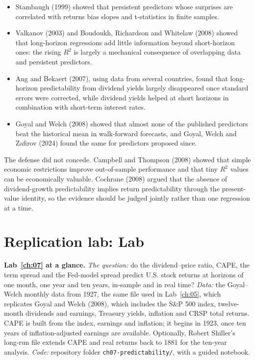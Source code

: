 \begin{itemize}
  \item Stambaugh (1999) showed that persistent predictors whose surprises are correlated with returns bias slopes and t-statistics in finite samples.
  \item Valkanov (2003) and Boudoukh, Richardson and Whitelaw (2008) showed that long-horizon regressions add little information beyond short-horizon ones: the rising $R^2$ is largely a mechanical consequence of overlapping data and persistent predictors.
  \item Ang and Bekaert (2007), using data from several countries, found that long-horizon predictability from dividend yields largely disappeared once standard errors were corrected, while dividend yields helped at short horizons in combination with short-term interest rates.
  \item Goyal and Welch (2008) showed that almost none of the published predictors beat the historical mean in walk-forward forecasts, and Goyal, Welch and Zafirov (2024) found the same for predictors proposed since.
\end{itemize}

The defense did not concede. Campbell and Thompson (2008) showed that simple economic restrictions improve out-of-sample performance and that tiny $R^2$ values can be economically valuable. Cochrane (2008) argued that the absence of dividend-growth predictability implies return predictability through the present-value identity, so the evidence should be judged jointly rather than one regression at a time.

\section{Replication lab: Lab~\thechapter}
\label{sec:07-lab}

\begin{callout}
\textbf{Lab~\ref{ch:07} at a glance.} \emph{The question:} do the dividend--price ratio, CAPE, the term spread and the Fed-model spread predict U.S. stock returns at horizons of one month, one year and ten years, in-sample and in real time? \emph{Data:} the Goyal--Welch monthly data from 1927, the same file used in Lab~\ref{ch:05}, which replicates Goyal and Welch (2008), which includes the S\&P 500 index, twelve-month dividends and earnings, Treasury yields, inflation and CRSP total returns. CAPE is built from the index, earnings and inflation; it begins in 1923, once ten years of inflation-adjusted earnings are available. Optionally, Robert Shiller's long-run file extends CAPE and real returns back to 1881 for the ten-year analysis. \emph{Code:} repository folder \texttt{ch07-predictability/}, with a guided notebook.
\end{callout}

